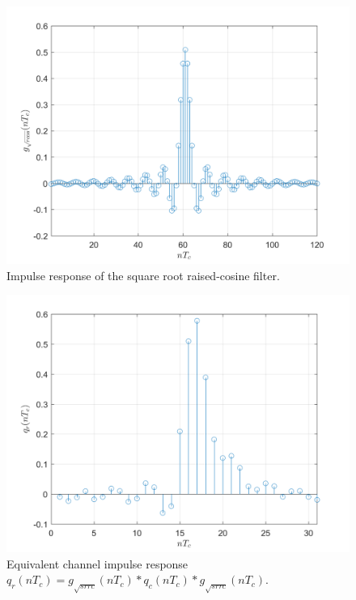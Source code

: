 \documentclass[a4paper, 12pt]{report}
\begin{document}
\begin{figure}[H]
	\centering
	\includegraphics[width=14cm]{gsrrc_1}
	\caption{Impulse response of the square root raised-cosine filter.}\label{srrc}
\end{figure}

\begin{figure}[H]
	\centering
	\includegraphics[width=14cm]{qr}
	\caption{Equivalent channel impulse response $q_r(nT_c) = g_{\sqrt{srrc}}(nT_c)*q_c(nT_c)*g_{\sqrt{srrc}}(nT_c)$.}\label{qr}
\end{figure}
\end{document}
